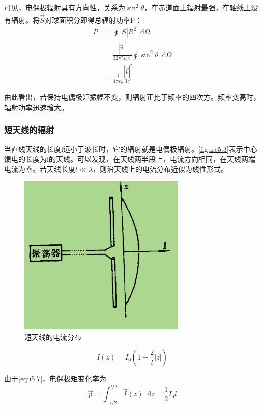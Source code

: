 \documentclass[UTF8]{ctexart}
\newcommand*{\dif}{\mathop{}\!\mathrm{d}}
\begin{document}
\noindent 可见，电偶极辐射具有方向性，关系为$\sin^2 \theta$，在赤道面上辐射最强，在轴线上没有辐射。将$\overline{\vec{S}}$对球面积分即得总辐射功率P：
\begin{equation}
    \begin{aligned}
        P &= \oint |\overline{S}| R^2 \dif \Omega \\ 
          &= \frac{|\ddot{\vec{p}}|^2}{32 \pi^2 \varepsilon_0 c^3} \oint \sin^2 \theta \dif \Omega \\ 
          &= \frac{1}{4 \pi \varepsilon_0}\frac{|\ddot{\vec{p}}|^2}{3c^3}
    \end{aligned}\label{equ5.8}
\end{equation}

\noindent 由此看出，若保持电偶极矩振幅不变，则辐射正比于频率的四次方。频率变高时，辐射功率迅速增大。

    \subsubsection{短天线的辐射}
    当直线天线的长度l远小于波长时，它的辐射就是电偶极辐射。\autoref{figure5.3}表示中心馈电的长度为l的天线。可以发现，在天线两半段上，电流方向相同，在天线两端电流为零。若天线长度$l \ll \lambda$，则沿天线上的电流分布近似为线性形式。
    \begin{figure}[htb]
        \centering
        \includegraphics[width=8cm]{figure5-3.png}
        \caption{短天线的电流分布}
        \label{figure5.3}
    \end{figure}

    \begin{equation}
        I(z) = I_0 \left(1- \frac{2}{l} |z|\right)
    \end{equation}

\noindent 由于\autoref{equ5.7}，电偶极矩变化率为
\begin{equation}
    \dot{\vec{p}} = \int_{-l/2}^{l/2} \vec{I}(z) \dif z = \frac{1}{2} I_0 l
\end{equation}
\end{document}
